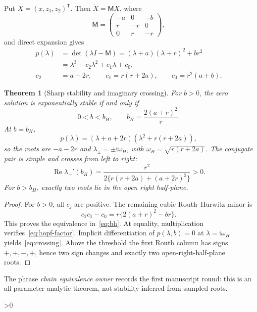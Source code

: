 \documentclass[9pt]{extarticle}
\providecommand{\CRevisionRound}{2}
\newtheorem{theorem}{Theorem}
\newcommand{\ii}{\mathrm i}
\newcommand{\M}{\mathsf M}
\begin{document}
Put $X=(x,z_1,z_2)^{\mathsf T}$.  Then $\dot X=\M X$, where
\[
 \M=\begin{pmatrix}-a&0&-b\\ r&-r&0\\0&r&-r\end{pmatrix},
\]
and direct expansion gives
\begin{align}
 p(\lambda)&=\det(\lambda I-\M)
 =(\lambda+a)(\lambda+r)^2+br^2 \label{eq:poly}\\
 &=\lambda^3+c_2\lambda^2+c_1\lambda+c_0,\nonumber\\
 c_2&=a+2r,\qquad c_1=r(r+2a),\qquad c_0=r^2(a+b).\nonumber
\end{align}

\begin{theorem}[Sharp stability and imaginary crossing]\label{thm:routh}
For $b>0$, the zero solution is exponentially stable if and only if
\begin{equation}\label{eq:bh}
 0<b<b_H,\qquad b_H=\frac{2(a+r)^2}{r}.
\end{equation}
At $b=b_H$,
\begin{equation}\label{eq:hopf-factor}
 p(\lambda)=(\lambda+a+2r)
 (\lambda^2+r(r+2a)),
\end{equation}
so the roots are $-a-2r$ and
$\lambda_\pm=\pm\ii\omega_H$, with
$\omega_H=\sqrt{r(r+2a)}$.  The conjugate pair is simple and crosses from
left to right:
\begin{equation}\label{eq:crossing}
 \operatorname{Re}\lambda_+'(b_H)
 =\frac{r^2}{2\{r(r+2a)+(a+2r)^2\}}>0.
\end{equation}
For $b>b_H$, exactly two roots lie in the open right half-plane.
\end{theorem}

\begin{proof}
For $b>0$, all $c_j$ are positive.  The remaining cubic Routh--Hurwitz
minor is
\[
 c_2c_1-c_0=r\{2(a+r)^2-br\}.
\]
This proves the equivalence in~\eqref{eq:bh}.  At equality, multiplication
verifies~\eqref{eq:hopf-factor}.  Implicit differentiation of
$p(\lambda,b)=0$ at $\lambda=\ii\omega_H$ yields~\eqref{eq:crossing}.
Above the threshold the first Routh column has signs $+,+,-,+$, hence two
sign changes and exactly two open-right-half-plane roots.
\end{proof}

The phrase \emph{chain equivalence owner} records the first manuscript
round: this is an all-parameter analytic theorem, not stability inferred
from sampled roots.

\ifnum\CRevisionRound>0
\end{document}
